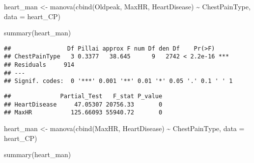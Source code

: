 \documentclass[
]{article}
\newenvironment{Shaded}{\begin{snugshade}}{\end{snugshade}}
\newcommand{\AttributeTok}[1]{\textcolor[rgb]{0.77,0.63,0.00}{#1}}
\newcommand{\CommentTok}[1]{\textcolor[rgb]{0.56,0.35,0.01}{\textit{#1}}}
\newcommand{\FunctionTok}[1]{\textcolor[rgb]{0.00,0.00,0.00}{#1}}
\newcommand{\NormalTok}[1]{#1}
\newcommand{\OtherTok}[1]{\textcolor[rgb]{0.56,0.35,0.01}{#1}}
\newcommand{\SpecialCharTok}[1]{\textcolor[rgb]{0.00,0.00,0.00}{#1}}
\begin{document}
\begin{Shaded}
\begin{Highlighting}[]
\NormalTok{heart\_man }\OtherTok{\textless{}{-}} \FunctionTok{manova}\NormalTok{(}\FunctionTok{cbind}\NormalTok{(Oldpeak, MaxHR, HeartDisease) }\SpecialCharTok{\textasciitilde{}}\NormalTok{ ChestPainType,}
    \AttributeTok{data =}\NormalTok{ heart\_CP)}

\FunctionTok{summary}\NormalTok{(heart\_man)}
\end{Highlighting}
\end{Shaded}

\begin{verbatim}
##                Df Pillai approx F num Df den Df    Pr(>F)    
## ChestPainType   3 0.3377   38.645      9   2742 < 2.2e-16 ***
## Residuals     914                                            
## ---
## Signif. codes:  0 '***' 0.001 '**' 0.01 '*' 0.05 '.' 0.1 ' ' 1
\end{verbatim}

\begin{Shaded}
\end{Shaded}

\begin{verbatim}
##              Partial_Test   F_stat P_value
## HeartDisease     47.05307 20756.33       0
## MaxHR           125.66093 55940.72       0
\end{verbatim}

\begin{Shaded}
\begin{Highlighting}[]
\NormalTok{heart\_man }\OtherTok{\textless{}{-}} \FunctionTok{manova}\NormalTok{(}\FunctionTok{cbind}\NormalTok{(MaxHR, HeartDisease) }\SpecialCharTok{\textasciitilde{}}\NormalTok{ ChestPainType,}
    \AttributeTok{data =}\NormalTok{ heart\_CP)}

\FunctionTok{summary}\NormalTok{(heart\_man)}
\end{Highlighting}
\end{Shaded}
\end{document}

